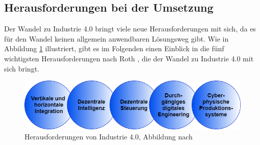 \subsection{Herausforderungen bei der Umsetzung}\label{sec:HerausforderungenUmsetzung}
Der Wandel zu Industrie 4.0 bringt viele neue Herausforderungen mit sich, da es für den Wandel keinen allgemein anwendbaren Lösungsweg gibt. Wie in Abbildung \ref{fig:HerausforderungenIndustrie4.0} illustriert, gibt es im Folgenden einen Einblick in die fünf wichtigsten Herausforderungen nach Roth \cite{14}, die der Wandel zu Industrie 4.0 mit sich bringt.
\begin{figure}[h]
	\centering
	\includegraphics[width=1\linewidth]{Bilder/A11_HerausforderungenIndustrie4}
	\caption{Herausforderungen von Industrie 4.0, Abbildung nach \cite[S.37]{14}}
	\label{fig:HerausforderungenIndustrie4.0}
\end{figure}

